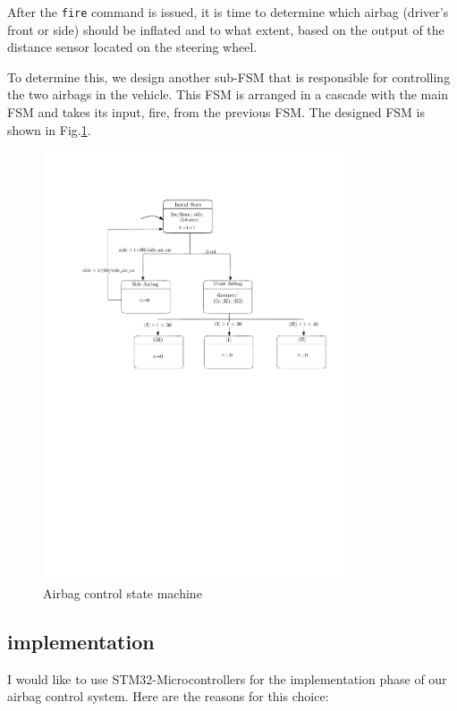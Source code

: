 \documentclass[12pt	]{article}
\begin{document}
After the \texttt{fire} command is issued, it is time to determine which airbag (driver's front or side) should be inflated and to what extent, based on the output of the distance sensor located on the steering wheel.

To determine this, we design another sub-FSM that is responsible for controlling the two airbags in the vehicle. This FSM is arranged in a cascade with the main FSM and takes its input, fire, from the previous FSM. The designed FSM is shown in Fig.\ref{fig:Airbag control state machine}.

\begin{figure}[h]
	\centering
	\includegraphics[width=0.8\textwidth]{Images/Ipe/FSM-air.pdf}
	\caption{Airbag control state machine}
	\label{fig:Airbag control state machine}
\end{figure}



\subsection{implementation}
I would like to use STM32-Microcontrollers for the implementation phase of our airbag control system. Here are the reasons for this choice:
\end{document}
